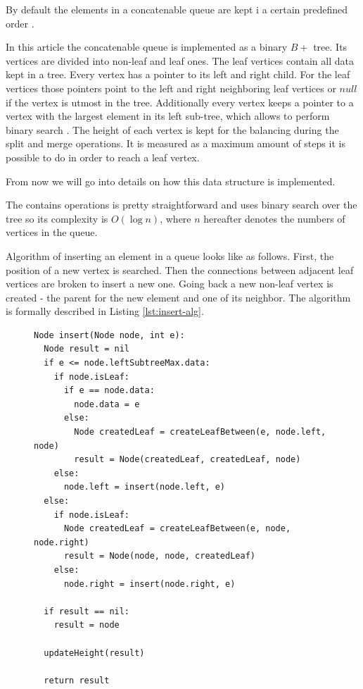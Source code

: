 \documentclass[twoside,twocolumn,10pt]{article}
\begin{document}
	By default the elements in a concatenable queue are kept i a certain predefined order \cite[pp..~155-157]{aho}.
	
	In this article the concatenable queue is implemented as a binary  $B+$ tree. Its vertices are divided into non-leaf and leaf ones. The leaf vertices contain all data kept in a tree. Every vertex has a pointer to its left and right child. For the leaf vertices those pointers point to the left and right neighboring leaf vertices or $null$ if the vertex is utmost in the tree. 
	Additionally every vertex keeps a pointer to a vertex with the largest element in its left sub-tree, which  allows to perform binary search \cite[pp..~155-157]{aho}. The height of each vertex is kept for the balancing during the split and merge operations. It is measured as a maximum amount of steps it is possible to do in order to reach a leaf vertex.
	
	From now we will go into details on how this data structure is implemented. 
	
	The contains operations is pretty straightforward and uses binary search over the tree so its complexity is $O(\log n)$, where $n$ hereafter denotes the numbers of vertices in the queue.
	
	Algorithm of inserting an element in a queue looks like as follows. First, the position of a new vertex is searched. Then the connections between adjacent leaf vertices are broken to insert a new one. Going back a new non-leaf vertex is created - the parent for the new element and one of its neighbor. The algorithm is formally described in Listing \ref{lst:insert-alg}.

		\begin{figure}[htbp]
			\begin{lstlisting}[caption={Queue insertion algorithm},label={lst:insert-alg},captionpos=b]
Node insert(Node node, int e):
  Node result = nil
  if e <= node.leftSubtreeMax.data:
  	if node.isLeaf:
  	  if e == node.data:
        node.data = e
  	  else:
        Node createdLeaf = createLeafBetween(e, node.left, node)
        result = Node(createdLeaf, createdLeaf, node)
    else:
      node.left = insert(node.left, e)
  else:
    if node.isLeaf:
      Node createdLeaf = createLeafBetween(e, node, node.right)
      result = Node(node, node, createdLeaf)
    else:
      node.right = insert(node.right, e)

  if result == nil:
  	result = node

  updateHeight(result)

  return result
			\end{lstlisting}
		\end{figure}
\end{document}
